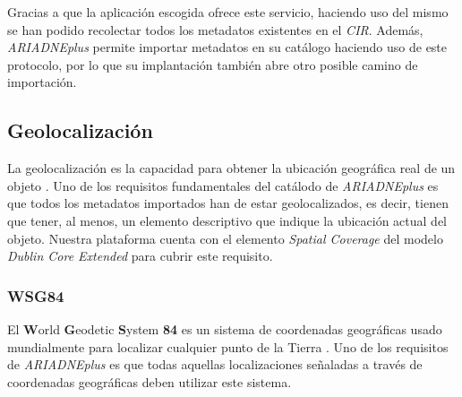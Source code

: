 Gracias a que la aplicación escogida ofrece este servicio, haciendo uso
del mismo se han podido recolectar todos los metadatos existentes en el
\emph{CIR}. Además, \emph{ARIADNEplus} permite importar metadatos en su catálogo
haciendo uso de este protocolo, por lo que su implantación también abre
otro posible camino de importación.


\subsection{Geolocalización}

La geolocalización es la capacidad para obtener la ubicación geográfica
real de un objeto \cite{wiki:geo}. Uno de
los requisitos fundamentales del catálodo de \emph{ARIADNEplus} es que todos
los metadatos importados han de estar geolocalizados, es decir, tienen
que tener, al menos, un elemento descriptivo que indique la ubicación
actual del objeto. Nuestra plataforma cuenta con el elemento
\emph{Spatial Coverage} del modelo \emph{Dublin Core Extended} para
cubrir este requisito.

\subsubsection{WSG84}

El \textbf{W}orld \textbf{G}eodetic \textbf{S}ystem \textbf{84} es un
sistema de coordenadas geográficas usado mundialmente para localizar
cualquier punto de la Tierra \cite{wiki:wsg}. Uno de los requisitos de
\emph{ARIADNEplus} es que todas aquellas localizaciones señaladas a través de
coordenadas geográficas deben utilizar este sistema.

